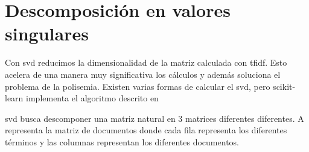 \documentclass[withindex, glossary]{cam-thesis}
\begin{document}
\section{Descomposición en valores singulares}
Con \acrfull{svd} reducimos la dimensionalidad de la matriz calculada con \acrshort{tfidf}. Esto acelera de una manera muy significativa los cálculos y además soluciona el problema de la polisemia. Existen varias formas de calcular el \acrshort{svd}, pero scikit-learn implementa el algoritmo descrito en 

\acrshort{svd} busca descomponer una matriz natural en 3 matrices diferentes diferentes. A representa la matriz de documentos donde cada fila representa los diferentes términos y las columnas representan los diferentes documentos.\cite{stanford-svd}
\end{document}
